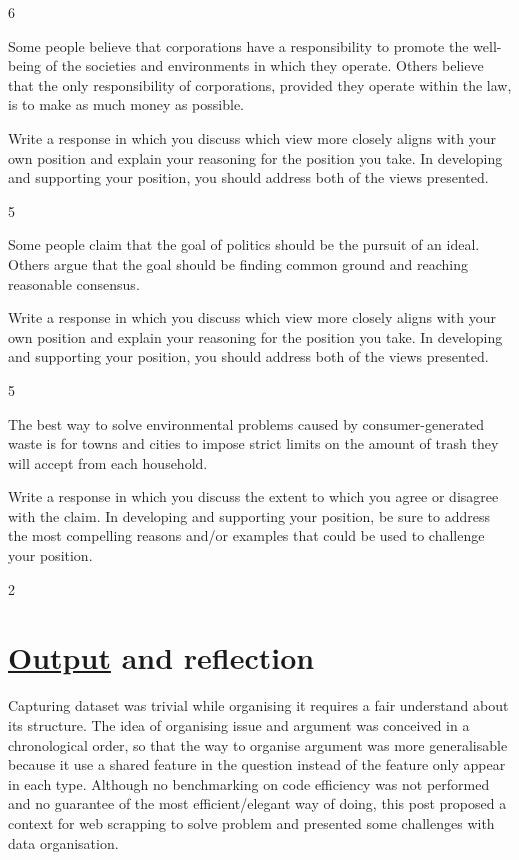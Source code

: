 \documentclass[]{article}
\begin{document}
6

Some people believe that corporations have a responsibility to promote
the well-being of the societies and environments in which they operate.
Others believe that the only responsibility of corporations, provided
they operate within the law, is to make as much money as possible.

Write a response in which you discuss which view more closely aligns
with your own position and explain your reasoning for the position you
take. In developing and supporting your position, you should address
both of the views presented.

5

Some people claim that the goal of politics should be the pursuit of an
ideal. Others argue that the goal should be finding common ground and
reaching reasonable consensus.

Write a response in which you discuss which view more closely aligns
with your own position and explain your reasoning for the position you
take. In developing and supporting your position, you should address
both of the views presented.

5

The best way to solve environmental problems caused by
consumer-generated waste is for towns and cities to impose strict limits
on the amount of trash they will accept from each household.

Write a response in which you discuss the extent to which you agree or
disagree with the claim. In developing and supporting your position, be
sure to address the most compelling reasons and/or examples that could
be used to challenge your position.

2

\hypertarget{output-and-reflection}{%
\section{\texorpdfstring{\href{/GRE_AW.xlsx}{Output} and
reflection}{Output and reflection}}\label{output-and-reflection}}

Capturing dataset was trivial while organising it requires a fair
understand about its structure. The idea of organising issue and
argument was conceived in a chronological order, so that the way to
organise argument was more generalisable because it use a shared feature
in the question instead of the feature only appear in each type.
Although no benchmarking on code efficiency was not performed and no
guarantee of the most efficient/elegant way of doing, this post proposed
a context for web scrapping to solve problem and presented some
challenges with data organisation.
\end{document}
